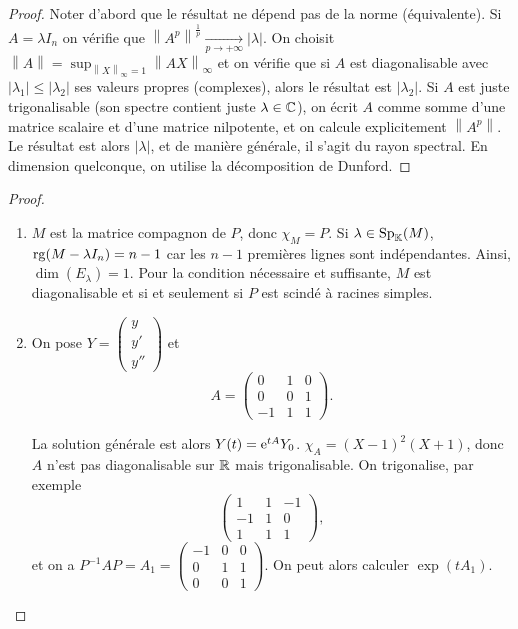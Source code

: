 \documentclass[12pt]{article}
\begin{document}
\begin{proof}
	Noter d'abord que le résultat ne dépend pas de la norme (équivalente).
	Si $A=\lambda I_n$ on vérifie que $\left\lVert A^{p}\right\rVert^{\frac{1}{p}}\xrightarrow[p\to+\infty]{}\left\lvert\lambda\right\rvert$. On choisit $\left\lVert A\right\rVert=\sup_{\left\lVert X\right\rVert_{\infty}=1}\left\lVert AX\right\rVert_{\infty}$ et on vérifie que si $A$ est diagonalisable avec $\left\lvert \lambda_{1}\right\rvert\leqslant\left\lvert\lambda_{2}\right\rvert$ ses valeurs propres (complexes), alors le résultat est $\left\lvert \lambda_{2}\right\rvert$. Si $A$ est juste trigonalisable (son spectre contient juste $\lambda\in\mathbb{C}$), on écrit $A$ comme somme d'une matrice scalaire et d'une matrice nilpotente, et on calcule explicitement $\left\lVert A^p\right\rVert$. Le résultat est alors $\left\lvert\lambda\right\rvert$, et de manière générale, il s'agit du rayon spectral. En dimension quelconque, on utilise la décomposition de Dunford.
\end{proof}

\begin{proof}\phantom{}
	\begin{enumerate}
		\item $M$ est la matrice compagnon de $P$, donc $\chi_{M}=P$. Si $\lambda\in\operatorname{Sp}_{\mathbb{K}}(M)$, $\operatorname{rg}(M-\lambda I_n)=n-1$ car les $n-1$ premières lignes sont indépendantes. Ainsi, $\dim(E_{\lambda})=1$. Pour la condition nécessaire et suffisante, $M$ est diagonalisable et si et seulement si $P$ est scindé à racines simples.
		\item On pose $Y=\begin{pmatrix}
			y\\y'\\y''
		\end{pmatrix}$ et 
		\begin{equation*}
			A=\begin{pmatrix}
				0&1&0\\
				0&0&1\\
				-1&1&1
			\end{pmatrix}.
		\end{equation*}

		La solution générale est alors $Y(t)=\mathrm{e}^{t A}Y_{0}$. $\chi_{A}=(X-1)^{2}(X+1)$, donc $A$ n'est pas diagonalisable sur $\mathbb{R}$ mais trigonalisable. On trigonalise, par exemple
		\begin{equation*}
			\begin{pmatrix}
				1&1&-1\\-1&1&0\\1&1&1
			\end{pmatrix},
		\end{equation*}
		et on a $P^{-1}AP=A_1=\begin{pmatrix}
			-1&0&0\\0&1&1\\0&0&1
		\end{pmatrix}$. On peut alors calculer $\exp(tA_{1})$.
	\end{enumerate}
\end{proof}
\end{document}
